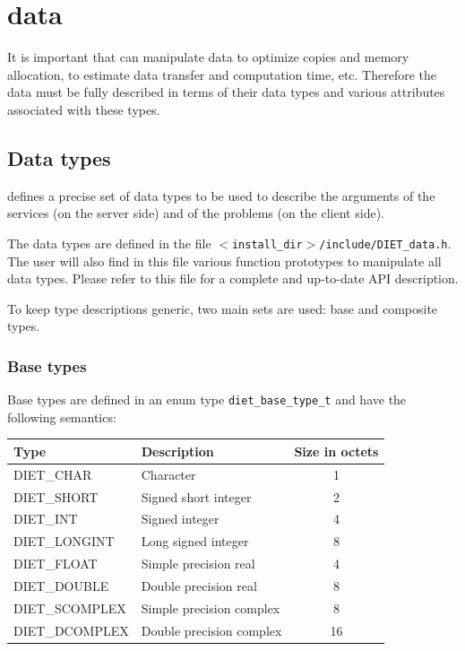 \chapter{\diet data}
\label{ch:data}

It is important that \diet can manipulate data to optimize copies and
memory allocation, to estimate data transfer and computation time,
etc. Therefore the data must be fully described in terms of their data 
types and various attributes associated with these types.

\section{Data types}
\label{sec:types}

\diet defines a precise set of data types to be used to describe the
arguments of the services (on the server side) and of the problems (on
the client side).

The \diet data types are defined in the file
\texttt{$<$install\_dir$>$/include/DIET\_data.h}. The user will also
find in this file various function prototypes to manipulate all \diet
data types. Please refer to this file for a complete and up-to-date
API description.

To keep \diet type descriptions generic, two main sets are used: base and
composite types.

\subsection{Base types}
\label{ssec:base}

Base types are defined in an enum type \texttt{diet\_base\_type\_t} and have the
following semantics:
\begin{center}
\footnotesize
\begin{tabular}{|l|l|c|}
\hline
\textbf{Type}&\textbf{Description}&\textbf{Size in octets}\\
\hline
\textsf{DIET\_CHAR}     & Character                &  1\\
\textsf{DIET\_SHORT}    & Signed short integer     &  2\\
\textsf{DIET\_INT}      & Signed integer           &  4\\
\textsf{DIET\_LONGINT}  & Long signed integer      &  8\\
\textsf{DIET\_FLOAT}    & Simple precision real    &  4\\
\textsf{DIET\_DOUBLE}   & Double precision real    &  8\\
\hline\hline
\textsf{DIET\_SCOMPLEX} & Simple precision complex &  8\\
\textsf{DIET\_DCOMPLEX} & Double precision complex & 16\\
\hline
\end{tabular}
\end{center}

